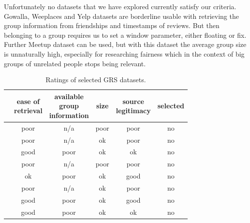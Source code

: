 Unfortunately no datasets that we have explored currently satisfy our criteria. Gowalla, Weeplaces and Yelp datasets are borderline usable with retrieving the group information from friendships and timestamps of reviews. But then belonging to a group requires us to set a window parameter, either floating or fix. Further Meetup dataset can be used, but with this dataset the average group size is unnaturally high, especially for researching fairness which in the context of big groups of unrelated people stops being relevant.

\begin{table}[!ht]
    \centering
    \begin{tabular}{ r | c c c c | c}
         & \makecell[c]{ease of \\ retrieval} & \makecell[c]{available \\ group \\ information} & size & \makecell[c]{source \\ legitimacy} & selected\\
        \hline
            \nameref{subsubsec:04_group_datasets.overview.camra}
                & poor & n/a & poor & poor & no\\
            \nameref{subsubsec:04_group_datasets.overview.douban}
                & poor & n/a & ok & poor & no \\
            \nameref{subsubsec:04_group_datasets.overview.gowalla}
                & good & poor & ok &  ok & no\\
            \nameref{subsubsec:04_group_datasets.overview.mafengwo}
                & poor & n/a & poor & poor & no\\
            \nameref{subsubsec:04_group_datasets.overview.meetup}
                & ok & poor & ok & good & no\\
            \nameref{subsubsec:04_group_datasets.overview.plancast}
                & poor & n/a & ok & poor & no\\
            \nameref{subsubsec:04_group_datasets.overview.yelp}
                & good & poor & ok & good & no\\
            \nameref{subsubsec:04_group_datasets.overview.weeplaces}
                &  good & poor & ok & ok & no\\
    \end{tabular}
    \caption{Ratings of selected GRS datasets.}
    \label{table:5.2_GRS_datasets_rating}
\end{table}

